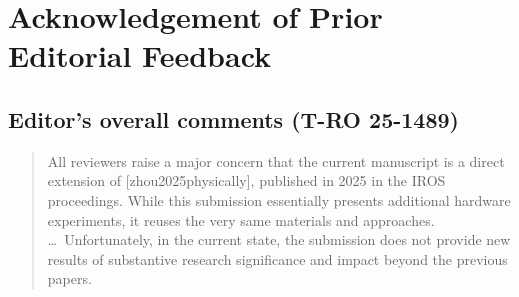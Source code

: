 \section*{Acknowledgement of Prior Editorial Feedback}
\subsection{Editor's overall comments (T-RO 25-1489)}
\begin{mdframed}
\begin{quote}
All reviewers raise a major concern that the current manuscript is a direct extension of [zhou2025physically], published in 2025 in the IROS proceedings. While this submission essentially presents additional hardware experiments, it reuses the very same materials and approaches. \ldots\ Unfortunately, in the current state, the submission does not provide new results of substantive research significance and impact beyond the previous papers.
\end{quote}
\end{mdframed}

